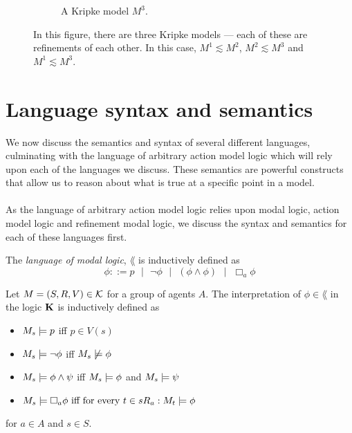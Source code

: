 \begin{figure}[ht!]
\begin{subfigure}[b]{.30\textwidth}
\caption{A Kripke model $M^3$.}
\label{afterfigure}
\end{subfigure}
\caption[Examples of refinements]{In this figure, there are three Kripke models --- each of these
are refinements of each other.
In this case, $M^1 \lesssim M^2$, $M^2 \lesssim M^3$ and $M^1 \lesssim M^3$.}
\label{figure:refinementExamples}
\end{figure}

\section{Language syntax and semantics} \label{subsec:prelim:semantics}

We now discuss the semantics and syntax of several different languages, culminating with the language of
arbitrary action model logic which will rely upon each of the languages we discuss.
These semantics are powerful constructs that allow us to reason about what is true at a specific
point in a model.\\
\\
As the language of arbitrary action model logic relies upon modal logic, action model logic and
refinement modal logic, we discuss the syntax and semantics for each of these languages first.

\begin{defn} \label{modalLogic:syntax}
The {\em language of modal logic}, $\lang$ is inductively defined as
\[
	\phi ::= p \text{ } | \text{ } \neg \phi \text{ } | \text{ } (\phi \land \phi) \text{ } | \text{ } \Box_a \phi
\]
\end{defn}

\begin{defn} \label{modalLogic:semantics}
Let $M = (S, R, V) \in \mathcal{K}$ for a group of agents $A$.
The interpretation of $\phi \in \lang$ in the logic $\bf K$ is inductively defined as

\begin{itemize}
	\item $M_s \models p$ iff $p \in V(s)$
	\item $M_s \models \neg \phi$ iff $M_s \not \models \phi$
	\item $M_s \models \phi \land \psi$ iff $M_s \models \phi$ and $M_s \models \psi$
	\item $M_s \models \Box_a \phi \text{ iff for every }t \in s R_a: M_t \models \phi$
\end{itemize}

for $a \in A$ and $s \in S$.
\end{defn}

